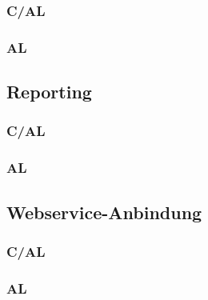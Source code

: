 \subsubsection{C/AL}
\subsubsection{AL}

\subsection{Reporting}
\subsubsection{C/AL}
\subsubsection{AL}

\subsection{Webservice-Anbindung}
\subsubsection{C/AL}
\subsubsection{AL}
















